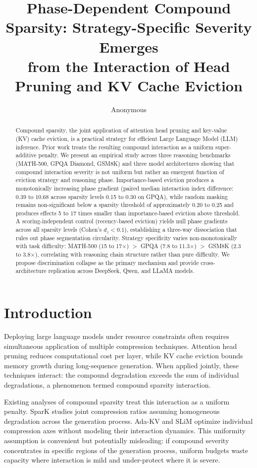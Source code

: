 \documentclass[11pt,a4paper]{article}
\title{Phase-Dependent Compound Sparsity: Strategy-Specific Severity Emerges\\from the Interaction of Head Pruning and KV Cache Eviction}
\author{Anonymous}
\date{}
\begin{document}
\maketitle

\begin{abstract}
Compound sparsity, the joint application of attention head pruning and key-value (KV) cache eviction, is a practical strategy for efficient Large Language Model (LLM) inference. Prior work treats the resulting compound interaction as a uniform super-additive penalty. We present an empirical study across three reasoning benchmarks (MATH-500, GPQA Diamond, GSM8K) and three model architectures showing that compound interaction severity is not uniform but rather an emergent function of eviction strategy and reasoning phase. Importance-based eviction produces a monotonically increasing phase gradient (paired median interaction index difference: 0.39 to 10.68 across sparsity levels 0.15 to 0.30 on GPQA), while random masking remains non-significant below a sparsity threshold of approximately 0.20 to 0.25 and produces effects 5 to 17 times smaller than importance-based eviction above threshold. A scoring-independent control (recency-based eviction) yields null phase gradients across all sparsity levels (Cohen's $d_z < 0.1$), establishing a three-way dissociation that rules out phase segmentation circularity. Strategy specificity varies non-monotonically with task difficulty: MATH-500 (15 to 17$\times$) $>$ GPQA (7.8 to 11.3$\times$) $>$ GSM8K (2.3 to 3.8$\times$), correlating with reasoning chain structure rather than pure difficulty. We propose discrimination collapse as the primary mechanism and provide cross-architecture replication across DeepSeek, Qwen, and LLaMA models.
\end{abstract}

\section{Introduction}

Deploying large language models under resource constraints often requires simultaneous application of multiple compression techniques. Attention head pruning reduces computational cost per layer, while KV cache eviction bounds memory growth during long-sequence generation. When applied jointly, these techniques interact: the compound degradation exceeds the sum of individual degradations, a phenomenon termed compound sparsity interaction.

Existing analyses of compound sparsity treat this interaction as a uniform penalty. SparK studies joint compression ratios assuming homogeneous degradation across the generation process. Ada-KV and SLiM optimize individual compression axes without modeling their interaction dynamics. This uniformity assumption is convenient but potentially misleading: if compound severity concentrates in specific regions of the generation process, uniform budgets waste capacity where interaction is mild and under-protect where it is severe.
\end{document}
